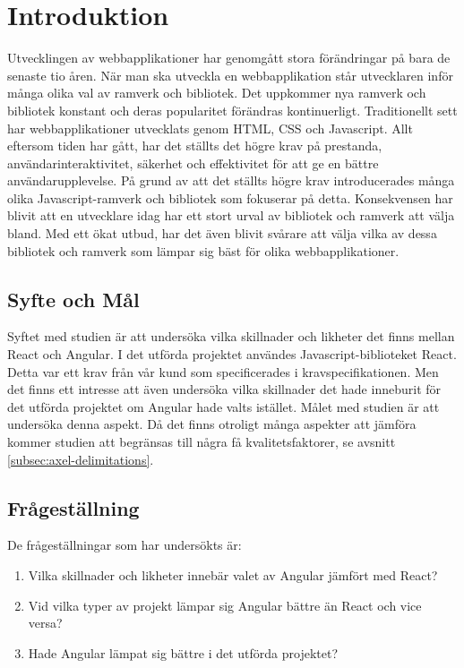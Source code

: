 \section{Introduktion}
\label{sec:axel-introduction}
Utvecklingen av webbapplikationer har genomgått stora förändringar på bara de senaste tio åren. \cite{changing} När man ska utveckla en webbapplikation står utvecklaren inför många olika val av ramverk och bibliotek. Det uppkommer nya ramverk och bibliotek konstant och deras popularitet förändras kontinuerligt. Traditionellt sett har webbapplikationer utvecklats genom HTML, CSS och Javascript. Allt eftersom tiden har gått, har det ställts det högre krav på prestanda, användarinteraktivitet, säkerhet och effektivitet för att ge en bättre användarupplevelse. På grund av att det ställts högre krav introducerades många olika Javascript-ramverk och bibliotek som fokuserar på detta. Konsekvensen har blivit att en utvecklare idag har ett stort urval av bibliotek och ramverk att välja bland. Med ett ökat utbud, har det även blivit svårare att välja vilka av dessa bibliotek och ramverk som lämpar sig bäst för olika webbapplikationer.

\subsection{Syfte och Mål}
\label{subsec:axel-motivation}

Syftet med studien är att undersöka vilka skillnader och likheter det finns mellan React och Angular. I det utförda projektet användes Javascript-biblioteket React. Detta var ett krav från vår kund som specificerades i kravspecifikationen. Men det finns ett intresse att även undersöka vilka skillnader det hade inneburit för det utförda projektet om Angular hade valts istället. Målet med studien är att undersöka denna aspekt. Då det finns otroligt många aspekter att jämföra kommer studien att begränsas till några få kvalitetsfaktorer, se avsnitt \ref{subsec:axel-delimitations}.

\subsection{Frågeställning}
\label{subsec:axel-research-questions}

De frågeställningar som har undersökts är:

\begin{enumerate}
\item\label{axel-fs:1} Vilka skillnader och likheter innebär valet av Angular jämfört med React?

\item\label{axel-fs:2} Vid vilka typer av projekt lämpar sig Angular bättre än React och vice versa?

\item\label{axel-fs:3} Hade Angular lämpat sig bättre i det utförda projektet?


\end{enumerate}


